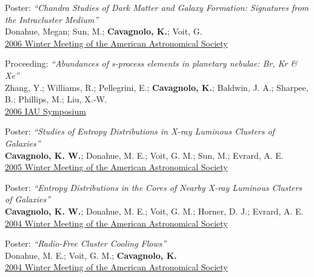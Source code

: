 \documentclass[12pt]{cv}
\begin{document}
\begin{llist}
{\sc Poster: {\textit{``Chandra Studies of Dark Matter and Galaxy Formation:
Signatures from the Intracluster Medium''}}}\\
Donahue, Megan; Sun, M.; {\bf Cavagnolo, K.}; Voit, G.\\
\href{http://adsabs.harvard.edu/abs/2006AAS...209.7711D}{2006 Winter
Meeting of the American Astronomical Society}

{\sc Proceeding: {\textit{``Abundances of s-process elements in planetary nebulae: Br, Kr \& Xe''}}}\\
Zhang, Y.; Williams, R.; Pellegrini, E.; {\bf Cavagnolo, K.}; Baldwin,
J. A.; Sharpee, B.; Phillips, M.; Liu, X.-W.\\
\href{http://adsabs.harvard.edu/abs/2006IAUS..234..549Z}{2006 IAU
Symposium}

{\sc Poster: {\textit{``Studies of Entropy Distributions in X-ray Luminous Clusters of Galaxies''}}}\\
{\bf Cavagnolo, K. W.}; Donahue, M. E.; Voit, G. M.; Sun, M.; Evrard, A. E.\\
\href{http://adsabs.harvard.edu/abs/2005AAS...20713903C}{2005 Winter
Meeting of the American Astronomical Society}

{\sc Poster: {\textit{``Entropy Distributions in the Cores of Nearby X-ray Luminous Clusters of Galaxies''}}}\\
{\bf Cavagnolo, K. W.}; Donahue, M. E.; Voit, G. M.; Horner, D. J.; Evrard, A. E.\\
\href{http://adsabs.harvard.edu/abs/2004AAS...20514715C}{2004 Winter
Meeting of the American Astronomical Society}

{\sc Poster: {\textit{``Radio-Free Cluster Cooling Flows''}}}\\
Donahue, M. E.; Voit, G. M.; {\bf Cavagnolo, K.}\\
\href{http://adsabs.harvard.edu/abs/2004AAS...205.6020D}{2004 Winter
Meeting of the American Astronomical Society}



\end{llist}
\end{document}
